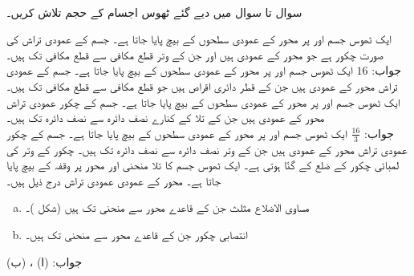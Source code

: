 \\
سوال  تا سوال  میں دیے گئے ٹھوس اجسام کے حجم تلاش کریں۔

ایک ٹھوس جسم  اور  پر   محور کے عمودی سطحوں کے بیچ پایا جاتا ہے۔ جسم کے عمودی تراش کی صورت چکور ہے جو   محور کے عمودی ہیں اور جن کے وتر قطع مکافی  سے قطع مکافی  تک ہیں۔\\
جواب:\quad
$16$
ایک ٹھوس جسم  اور  پر   محور کے عمودی سطحوں کے بیچ پایا جاتا ہے۔ جسم کے عمودی تراش  محور کے عمودی ہیں جن کے قطر دائری اقراص ہیں جو قطع مکافی  سے قطع مکافی  تک ہیں۔   
ایک ٹھوس جسم  اور  پر   محور کے عمودی سطحوں کے بیچ پایا جاتا ہے۔ جسم کے چکور عمودی تراش  محور کے عمودی ہیں جن کے تلا کے کنارے نصف دائرہ  سے نصف دائرہ  تک ہیں۔ \\
جواب:\quad
$\tfrac{16}{3}$  
ایک ٹھوس جسم  اور  پر   محور کے عمودی سطحوں کے بیچ پایا جاتا ہے۔ جسم کے چکور عمودی تراش  محور کے عمودی ہیں جن کے وتر نصف دائرہ  سے نصف دائرہ  تک ہیں۔ چکور کے وتر کی لمبائی چکور کے ضلع کے  گنّا ہوتی ہے۔
ایک ٹھوس جسم کا تلا منحنی  اور  محور پر وقفہ   کے بیچ پایا جاتا ہے۔  محور کے عمودی عمودی تراش درج ذیل ہیں۔
\begin{enumerate}[a.]
\item
مساوی الاضلاع  مثلث جن کے قاعدے  محور سے منحنی تک ہیں (شکل )۔
\item
انتصابی چکور جن کے قاعدے  محور سے منحنی تک ہیں۔
\end{enumerate}
جواب:\quad
(ا) ، (ب) 
